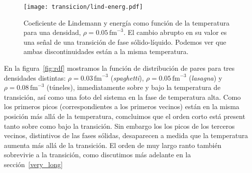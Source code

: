 \begin{figure}[h!]  \centering
\texttt{[image: transicion/lind-energ.pdf]}
\caption{Coeficiente de Lindemann y energía como función de la temperatura para una densidad, $\rho=0.05\,\text{fm}^{-3}$.
  El cambio abrupto en su valor es una señal de una transición de fase sólido-líquido.
  Podemos ver que ambas discontinuidades están a la misma temperatura.}
\label{fig:lind-energ}
\end{figure}

En la figura~\ref{fig:rdf} mostramos la función de distribución de pares para tres densidades distintas: $\rho=0.03\,\text{fm}^{-3}$ (\emph{spaghetti}), $\rho=0.05\,\text{fm}^{-3}$ (\emph{lasagna}) y $\rho=0.08\,\text{fm}^{-3}$ (túneles), inmediatamente sobre y bajo la temperatura de transición, así como una foto del sistema en la fase de temperatura alta.
Como los primeros picos (correspondientes a los primeros vecinos) están en la misma posición más allá de la temperatura, comcluimos que el orden corto está present tanto sobre como bajo la transición.
Sin embargo los los picos de los terceros vecinos, distintivos de las fases sólidas, desaparecen a medida que la temperatura aumenta más allá de la transición.
El orden de muy largo ranto también sobrevivie a la transición, como discutimos más adelante en la sección~\ref{very_long}

